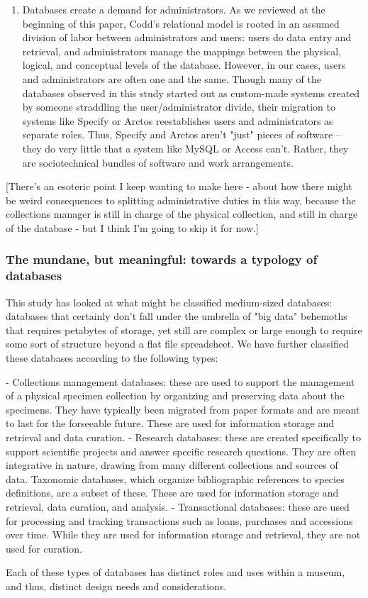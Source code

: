 \begin{enumerate}
\item Databases create a demand for administrators. As we reviewed at the beginning of this paper, Codd’s relational model is rooted in an assumed division of labor between administrators and users: users do data entry and retrieval, and administrators manage the mappings between the physical, logical, and conceptual levels of the database. However, in our cases, users and administrators are often one and the same. Though many of the databases observed in this study started out as custom-made systems created by someone straddling the user/administrator divide, their migration to systems like Specify or Arctos reestablishes users and administrators as separate roles. Thus, Specify and Arctos aren't "just" pieces of software -- they do very little that a system like MySQL or Access can't. Rather, they are sociotechnical bundles of software and work arrangements.
\end{enumerate}

[There's an esoteric point I keep wanting to make here - about how there might be weird consequences to splitting administrative duties in this way, because the collections manager is still in charge of the physical collection, and still in charge of the database - but I think I'm going to skip it for now.]

\subsubsection{The mundane, but meaningful: towards a typology of databases}

This study has looked at what might be classified medium-sized databases: databases that certainly don't fall under the umbrella of "big data" behemoths that requires petabytes of storage, yet still are complex or large enough to require some sort of structure beyond a flat file spreadsheet. We have further classified these databases according to the following types:

- Collections management databases: these are used to support the management of a physical specimen collection by organizing and preserving data about the specimens. They have typically been migrated from paper formats and are meant to last for the forseeable future. These are used for information storage and retrieval and data curation.
- Research databases: these are created specifically to support scientific projects and answer specific research questions. They are often integrative in nature, drawing from many different collections and sources of data. Taxonomic databases, which organize bibliographic references to species definitions, are a subset of these. These are used for information storage and retrieval, data curation, and analysis.
- Transactional databases: these are used for processing and tracking transactions such as loans, purchases and accessions over time. While they are used for information storage and retrieval, they are not used for curation.

Each of these types of databases has distinct roles and uses within a museum, and thus, distinct design needs and considerations. 


